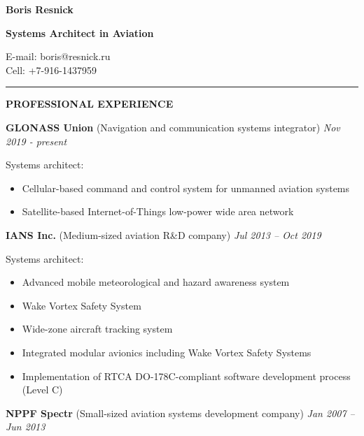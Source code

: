 \documentclass[a4paper]{article}
\begin{document}
    \thispagestyle{empty}
    
	\begin{center}
		{\Large \textbf{Boris Resnick}\par}
		\vspace{2mm}
		{\large \textbf{Systems Architect in Aviation}\par}
		\vspace{1mm}
		E-mail: boris@resnick.ru\\
		Cell: +7-916-1437959
	\end{center}
	\vspace{-2mm}
	\rule{\textwidth}{1pt}
	\vspace{2mm}

	\textbf{PROFESSIONAL EXPERIENCE}
	\vspace{4mm}

	\textbf{GLONASS Union} (Navigation and communication systems integrator) \hfill \textit{Nov 2019 - present}
	\vspace{1mm}
	
    Systems architect:
	\begin{itemize}
	    \setlength{\itemindent}{.5cm}
	    \item Cellular-based command and control system for unmanned aviation systems
        \item Satellite-based Internet-of-Things low-power wide area network
    \end{itemize}
    \vspace{3mm}
    
    \textbf{IANS Inc.} (Medium-sized aviation R\&D company) \hfill \textit{ Jul 2013 -- Oct 2019}
    \vspace{1mm}
    
    Systems architect:
	\begin{itemize}
	    \setlength{\itemindent}{.5cm}
	    \item Advanced mobile meteorological and hazard awareness system
	    \item Wake Vortex Safety System
	    \item Wide-zone aircraft tracking system
	    \item Integrated modular avionics including Wake Vortex Safety Systems
	    \item Implementation of RTCA DO-178C-compliant software development process (Level C)
    \end{itemize}
    \vspace{3mm}
    
    \textbf{NPPF Spectr} (Small-sized aviation systems development company) \hfill \textit{Jan 2007 -- Jun 2013}
    \vspace{1mm}
    
\end{document}
